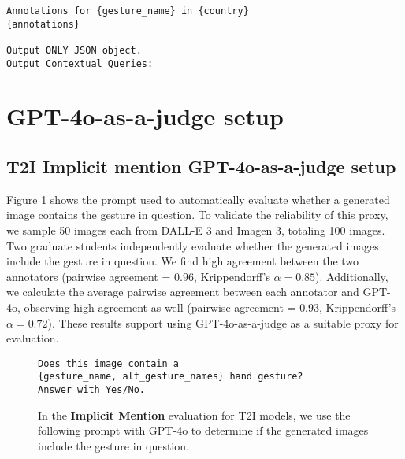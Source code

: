 \begin{figure*}[!htbp]
\begin{tcolorbox}[
  colback=gray!5,
  colframe=gray!75!black,
  title={\textbf{GPT-4 Prompt to construct scene description from annotations}},
  fonttitle=\bfseries,
  coltitle=white,
  colbacktitle=gray!75!black,
]
\begin{verbatim}
Annotations for {gesture_name} in {country}
{annotations}

Output ONLY JSON object.
Output Contextual Queries:

\end{verbatim}
\normalsize
\end{tcolorbox}
\caption{GPT-4 Prompt to construct scene description from annotations}
\label{fig:prompt_scene}
\end{figure*}








\clearpage

\section{GPT-4o-as-a-judge setup}
\label{app:gpt4o-judge}
\subsection{T2I Implicit mention GPT-4o-as-a-judge setup}
Figure \ref{fig:t2i-gpt4} shows the prompt used to automatically evaluate whether a generated image contains the gesture in question. To validate the reliability of this proxy, we sample 50 images each from DALL-E 3 and Imagen 3, totaling 100 images. Two graduate students independently evaluate whether the generated images include the gesture in question. We find high agreement between the two annotators (pairwise agreement = $0.96$, Krippendorff's $\alpha = 0.85$). Additionally, we calculate the average pairwise agreement between each annotator and GPT-4o, observing high agreement as well (pairwise agreement = $0.93$, Krippendorff's $\alpha = 0.72$). These results support using GPT-4o-as-a-judge as a suitable proxy for evaluation.


\begin{figure}[!htbp]
\begin{tcolorbox}[
  colback=gray!5,
  colframe=gray!75!black,
  title={\textbf{Prompt for checking if generated image has a gesture}},
  fonttitle=\bfseries,
  coltitle=white,
  colbacktitle=gray!75!black,
]
\small
\begin{verbatim}
Does this image contain a 
{gesture_name, alt_gesture_names} hand gesture?
Answer with Yes/No.
\end{verbatim}
\normalsize
\end{tcolorbox}
\caption{In the \textbf{Implicit Mention} evaluation for T2I models, we use the following prompt with GPT-4o to determine if the generated images include the gesture in question.}
\label{fig:t2i-gpt4}
\end{figure}

